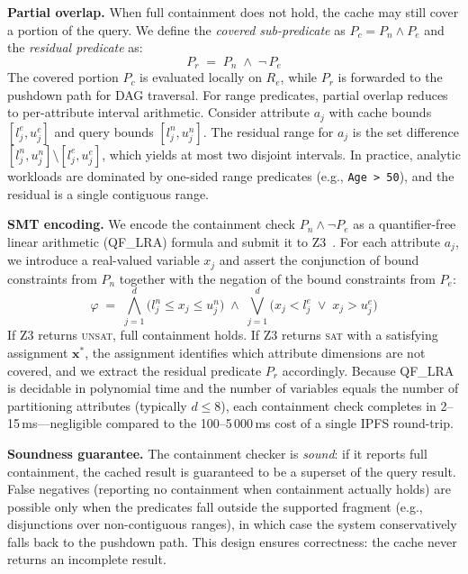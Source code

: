 \textbf{Partial overlap.}
When full containment does not hold, the cache may still cover a portion of the query.
We define the \emph{covered sub-predicate} as $P_c = P_n \wedge P_e$ and the \emph{residual predicate} as:
\begin{equation}
    P_r \;=\; P_n \;\wedge\; \neg\, P_e
    \label{eq:residual}
\end{equation}
The covered portion $P_c$ is evaluated locally on $R_e$, while $P_r$ is forwarded to the pushdown path for DAG traversal.
For range predicates, partial overlap reduces to per-attribute interval arithmetic.
Consider attribute $a_j$ with cache bounds $[l_j^e, u_j^e]$ and query bounds $[l_j^n, u_j^n]$.
The residual range for $a_j$ is the set difference $[l_j^n, u_j^n] \setminus [l_j^e, u_j^e]$, which yields at most two disjoint intervals.
In practice, analytic workloads are dominated by one-sided range predicates (e.g., \texttt{Age > 50}), and the residual is a single contiguous range.

\textbf{SMT encoding.}
We encode the containment check $P_n \wedge \neg P_e$ as a quantifier-free linear arithmetic (QF\_LRA) formula and submit it to Z3~\cite{de2008z3}.
For each attribute $a_j$, we introduce a real-valued variable $x_j$ and assert the conjunction of bound constraints from $P_n$ together with the negation of the bound constraints from $P_e$:
\begin{equation}
    \varphi \;=\; \bigwedge_{j=1}^{d}\bigl(l_j^n \leq x_j \leq u_j^n\bigr)
                  \;\wedge\;
                  \bigvee_{j=1}^{d}\bigl(x_j < l_j^e \;\vee\; x_j > u_j^e\bigr)
    \label{eq:smt}
\end{equation}
If Z3 returns \textsc{unsat}, full containment holds.
If Z3 returns \textsc{sat} with a satisfying assignment $\mathbf{x}^*$, the assignment identifies which attribute dimensions are not covered, and we extract the residual predicate $P_r$ accordingly.
Because QF\_LRA is decidable in polynomial time and the number of variables equals the number of partitioning attributes (typically $d \leq 8$), each containment check completes in 2--15\,ms---negligible compared to the 100--5\,000\,ms cost of a single IPFS round-trip.

\textbf{Soundness guarantee.}
The containment checker is \emph{sound}: if it reports full containment, the cached result is guaranteed to be a superset of the query result.
False negatives (reporting no containment when containment actually holds) are possible only when the predicates fall outside the supported fragment (e.g., disjunctions over non-contiguous ranges), in which case the system conservatively falls back to the pushdown path.
This design ensures correctness: the cache never returns an incomplete result.

